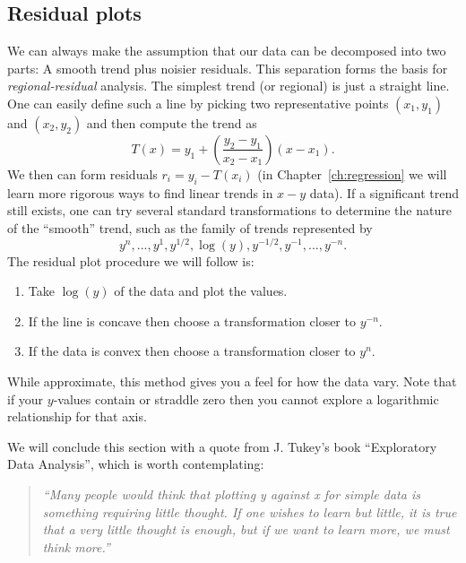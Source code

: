 \subsection{Residual plots}
	We can always make the assumption that our data can be decomposed into two parts: A 
smooth trend plus noisier residuals.  This separation forms the basis for \emph{regional-residual} analysis.
The simplest trend (or regional) is just a straight line.  One can easily define such 
a line by picking two representative points $(x_1,y_1)$ and $(x_2,y_2)$ and then compute the trend as
\begin{equation}
T(x) = y_1 + \left ( \frac{y_2 - y_1}{x_2 - x_1}\right ) (x - x_1).
\end{equation}
We then can form residuals $r_i = y_i - T(x_i)$ (in Chapter~\ref{ch:regression} we will learn more rigorous ways to find 
linear trends in $x-y$ data).  If a significant trend still exists, one can try several standard 
transformations to determine the nature of the ``smooth'' trend, such as the family of trends represented by
\begin{equation}
y^n,..., y^1, y^{1/2}, \log(y), y^{-1/2}, y^{-1},..., y^{-n}.
\end{equation}
The residual plot procedure we will follow is:
\begin{enumerate}
	\item Take $\log (y)$ of the data and plot the values.
	\item If the line is concave then choose a transformation closer to $y^{-n}$.
	\item If the data is convex then choose a  transformation closer to $y^n$.
\end{enumerate}
While approximate, this method gives you a feel for how the data 
vary.  Note that if your $y$-values contain or straddle zero then you cannot explore a logarithmic relationship for that axis.

	We will conclude this section with a quote from J. Tukey's book ``Exploratory Data Analysis'',
which is worth contemplating: 

\begin{quote}
\emph{``Many people would think that plotting y against x for simple data is something 
requiring little thought.  If one wishes to learn but little, it is true that a very little 
thought is enough, but if we want to learn more, we must think more.''}
\end{quote}

